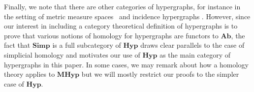 \documentclass{amsart}
\newcommand{\Simp}{\mathrm{\textbf{Simp}}}
\newcommand{\Ab}{\mathrm{\textbf{Ab}}}
\newcommand{\Hyp}{\mathrm{\textbf{Hyp}}}
\newcommand{\MHyp}{\mathrm{\textbf{MHyp}}}
\renewcommand{\H}{\mathcal{H}}
\begin{document}
Finally, we note that there are other categories of hypergraphs, for instance in the setting of metric measure spaces~\cite{ChowdhuryNeedhamSemrad2023} and incidence hypergraphs \cite[Definition 3.11]{grilliette2023incidence}. However, since our interest in including a category theoretical definition of hypergraphs is to prove that various notions of homology for hypergraphs are functors to $\Ab$, the fact that $\Simp$ is a full subcategory of $\Hyp$ draws clear parallels to the case of simplicial homology and motivates our use of $\Hyp$ as the main category of hypergraphs in this paper. In some cases, we may remark about how a homology theory applies to $\MHyp$ but we will mostly restrict our proofs to the simpler case of $\Hyp$.





\end{document}
